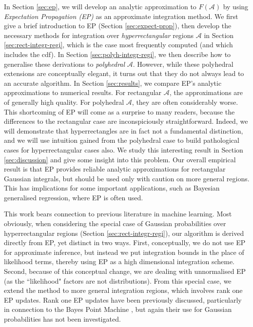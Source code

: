 \documentclass[twoside,11pt]{article}
\def\regionA{\mathcal{A}}
\begin{document}
In Section \ref{sec:ep}, we will develop an analytic approximation to $F(\regionA)$ by using \emph{Expectation Propagation (EP)} \cite[]{minka01phd, minkaUAI01,minkaMSFTTR2005, opperTAP2000} as an approximate integration method. We first give a brief introduction to EP (Section \ref{sec:expect-prop}), then develop the necessary methods for integration over \emph{hyperrectangular} regions $\regionA$ in Section \ref{sec:rect-integr-regi}, which is the case most frequently computed (and which includes the cdf).  In Section \ref{sec:polyh-integr-regi}, we then describe how to generalise these derivations to \emph{polyhedral} $\regionA$. However, while these polyhedral extensions are conceptually elegant, it turns out that they do not always lead to an accurate algorithm. In Section \ref{sec:results}, we compare EP's analytic approximations to numerical results. For rectangular $\regionA$, the approximations are of generally high quality. For polyhedral $\regionA$, they are often considerably worse. This shortcoming of EP will come as a surprise to many readers, because the differences to the rectangular case are inconspiciously straightforward.  Indeed, we will demonstrate that hyperrectangles are in fact not a fundamental distinction, and we will use intuition gained from the polyhedral case to build pathological cases for hyperrectangular cases also.  We study this interesting result in Section \ref{sec:discussion} and give some insight into this problem. Our overall empirical result is that EP provides reliable analytic approximations for rectangular Gaussian integrals, but should be used only with caution on more general regions. This has implications for some important applications, such as Bayesian generalised regression, where EP is often used.

This work bears connection to previous literature in machine learning.  Most obviously, when considering the special case of Gaussian probabilities over hyperrectangular regions (Section \ref{sec:rect-integr-regi}), our algorithm is derived directly from EP, yet distinct in two ways.  First, conceptually, we do not use EP for approximate inference, but instead we put integration bounds in the place of likelihood terms, thereby using EP as a high dimensional integration scheme.  Second, because of this conceptual change, we are dealing with unnormalised EP (as the ``likelihood" factors are not distributions).  From this special case, we extend the method to more general integration regions, which involves rank one EP updates.  Rank one EP updates have been previously discussed, particularly in connection to the Bayes Point Machine \cite[]{minkaUAI01, herbrichBook, minkaTR2008}, but again their use for Gaussian probabilities has not been investigated. 
\end{document}

